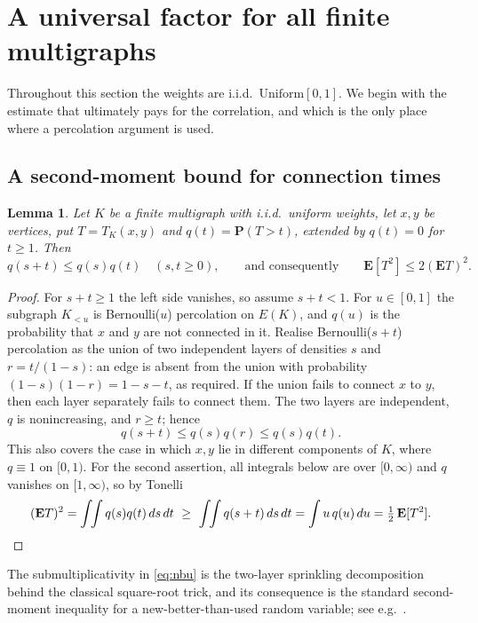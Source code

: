 \documentclass[10pt,a4paper]{amsart}
\newtheorem{lemma}[theorem]{Lemma}
\newcommand{\E}{\mathbf{E}}
\newcommand{\PP}{\mathbf{P}}
\begin{document}
\section{A universal factor for all finite multigraphs}
\label{sec:universal}

Throughout this section the weights are i.i.d.\ $\mathrm{Uniform}[0,1]$. We
begin with the estimate that ultimately pays for the correlation, and which is
the only place where a percolation argument is used.

\subsection{A second-moment bound for connection times}

\begin{lemma}
\label{lem:nbu}
Let $K$ be a finite multigraph with i.i.d.\ uniform weights, let $x,y$ be
vertices, put $T=T_K(x,y)$ and $q(t)=\PP(T>t)$, extended by $q(t)=0$ for
$t\ge1$. Then
\begin{equation}
\label{eq:nbu}
q(s+t)\le q(s)q(t)\quad(s,t\ge0),
\qquad\text{and consequently}\qquad
\E[T^2]\le2(\E T)^2 .
\end{equation}
\end{lemma}

\begin{proof}
For $s+t\ge1$ the left side vanishes, so assume $s+t<1$. For $u\in[0,1]$ the
subgraph $K_{<u}$ is Bernoulli($u$) percolation on $E(K)$, and $q(u)$ is the
probability that $x$ and $y$ are not connected in it. Realise Bernoulli($s+t$)
percolation as the union of two independent layers of densities $s$ and
$r=t/(1-s)$: an edge is absent from the union with probability
$(1-s)(1-r)=1-s-t$, as required. If the union fails to connect $x$ to $y$, then
each layer separately fails to connect them. The two layers are independent, $q$
is nonincreasing, and $r\ge t$; hence
\[
q(s+t)\le q(s)q(r)\le q(s)q(t).
\]
This also covers the case in which $x,y$ lie in different components of $K$,
where $q\equiv1$ on $[0,1)$. For the second assertion, all integrals below are
over $[0,\infty)$ and $q$ vanishes on $[1,\infty)$, so by Tonelli
\[
(\E T)^2=\int\!\!\int q(s)q(t)\,ds\,dt
\ \ge\ \int\!\!\int q(s+t)\,ds\,dt
=\int u\,q(u)\,du=\tfrac12\,\E[T^2] .\qedhere
\]
\end{proof}

The submultiplicativity in \eqref{eq:nbu} is the two-layer sprinkling
decomposition behind the classical square-root trick, and its consequence is the
standard second-moment inequality for a new-better-than-used random variable;
see e.g.\ \cite{BarlowProschan}.
\end{document}
